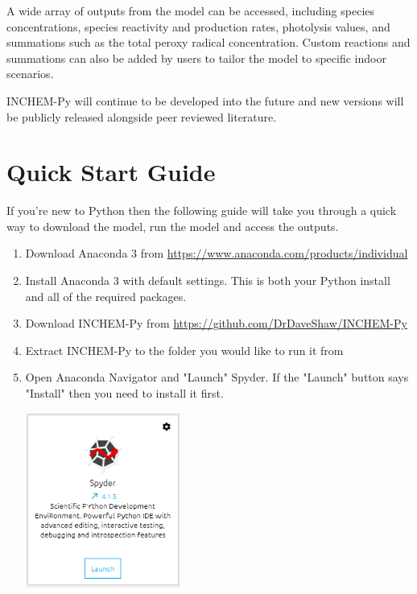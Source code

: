\documentclass[a4paper]{refart}
\begin{document}
A wide array of outputs from the model can be accessed, including species concentrations, species reactivity and production rates, photolysis values, and summations such as the total peroxy radical concentration. Custom reactions and summations can also be added by users to tailor the model to specific indoor scenarios.

INCHEM-Py will continue to be developed into the future and new versions will be publicly released alongside peer reviewed literature.

\section{Quick Start Guide}\label{Quick start}
\vspace{0.2cm}
{\hspace*{-\leftmarginwidth}
\begin{minipage}{\fullwidth}
If you're new to Python then the following guide will take you through a quick way to download the model, run the model and access the outputs.
\linespread{2.0}\selectfont
\begin{enumerate}
    \item Download Anaconda 3 from \url{https://www.anaconda.com/products/individual}
    \item Install Anaconda 3 with default settings. This is both your Python install and all of the required packages.
    \item Download INCHEM-Py from \url{https://github.com/DrDaveShaw/INCHEM-Py}
    \item Extract INCHEM-Py to the folder you would like to run it from
    \item Open Anaconda Navigator and "Launch" Spyder. If the "Launch" button says "Install" then you need to install it first.

            \vspace{1em}
            \begin{minipage}[t]{\linewidth}
                \centering
                \includegraphics[width = 0.4\textwidth]{Spyder.png}
            \end{minipage}


\end{enumerate}
\end{minipage}}
\end{document}
